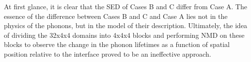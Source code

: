 \documentclass[aps,prb,preprint,preprintnumbers,amsmath,amssymb,floatfix,superscriptaddress]{revtex4}
\begin{document}
\begin{figure}[h!]
\centering
{}
\end{figure}
At first glance, it is clear that the SED of Cases B and C differ from Case A. The essence of the difference between Cases B and C and Case A lies not in the physics of the phonons, but in the model of their description. Ultimately, the idea of dividing the 32x4x4 domains into 4x4x4 blocks and performing NMD on these blocks to observe the change in the phonon lifetimes as a function of spatial position relative to the interface proved to be an ineffective approach.
\end{document}
